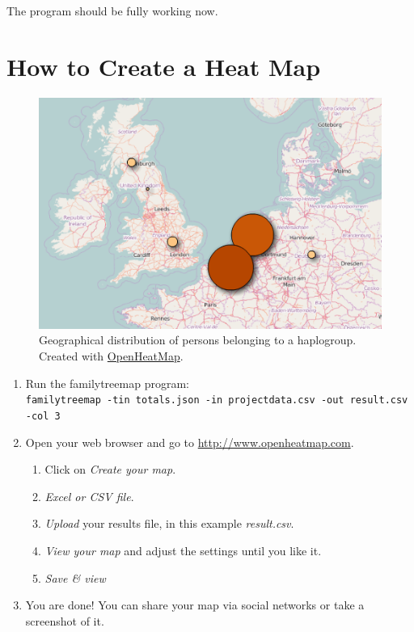\documentclass[12pt,a4paper]{article}
\begin{document}
\noindent
The program should be fully working now.


\section{How to Create a Heat Map}

\begin{figure}[ht]
\centering
\includegraphics[width=13cm]{heatmap.png}
\caption{Geographical distribution of persons belonging
to a haplogroup. Created with \href{http://www.openheatmap.com/}{OpenHeatMap}.}
\end{figure}

\begin{enumerate}
\item Run the familytreemap program:\\
  \texttt{familytreemap -tin totals.json -in projectdata.csv -out result.csv -col 3}
\item Open your web browser and go to
      \href{http://www.openheatmap.com/}{http://www.openheatmap.com}.
	\begin{enumerate}
	\item Click on \emph{Create your map}.
	\item \emph{Excel or CSV file}.
	\item \emph{Upload} your results file,
            in this example \emph{result.csv}.
	\item \emph{View your map} and adjust the settings until you like it.
	\item \emph{Save \& view}
	\end{enumerate}
\item You are done! You can share your map via social networks
  or take a screenshot of it.
\end{enumerate}
\end{document}
